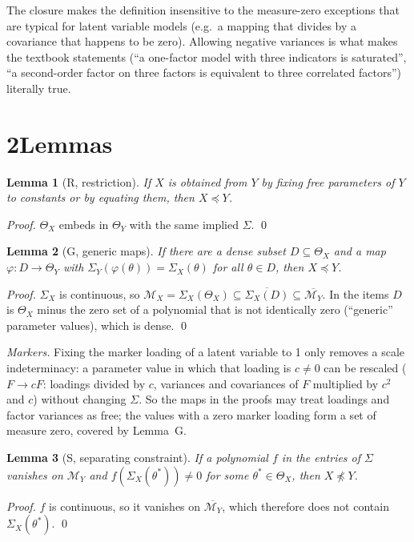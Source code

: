 \documentclass[10pt,a4paper]{article}
\newcommand{\nest}{\preceq}
\newcommand{\nnest}{\not\preceq}
\newtheorem*{lemma}{Lemma}
\begin{document}
The closure makes the definition insensitive to the measure-zero exceptions that are typical for latent variable models (e.g.\ a mapping that divides by a covariance that happens to be zero). Allowing negative variances is what makes the textbook statements (``a one-factor model with three indicators is saturated'', ``a second-order factor on three factors is equivalent to three correlated factors'') literally true.

\section*{2\quad Lemmas}

\begin{lemma}[R, restriction]
If $X$ is obtained from $Y$ by fixing free parameters of $Y$ to constants or by equating them, then $X\nest Y$.
\end{lemma}
\emph{Proof.} $\Theta_X$ embeds in $\Theta_Y$ with the same implied $\Sigma$. \qed

\begin{lemma}[G, generic maps]
If there are a dense subset $D\subseteq\Theta_X$ and a map $\varphi:D\to\Theta_Y$ with $\Sigma_Y(\varphi(\theta))=\Sigma_X(\theta)$ for all $\theta\in D$, then $X\nest Y$.
\end{lemma}
\emph{Proof.} $\Sigma_X$ is continuous, so $\mathcal M_X=\Sigma_X(\Theta_X)\subseteq\overline{\Sigma_X(D)}\subseteq\overline{\mathcal M_Y}$. In the items $D$ is $\Theta_X$ minus the zero set of a polynomial that is not identically zero (``generic'' parameter values), which is dense. \qed

\emph{Markers.} Fixing the marker loading of a latent variable to 1 only removes a scale indeterminacy: a parameter value in which that loading is $c\neq0$ can be rescaled ($F\to cF$: loadings divided by $c$, variances and covariances of $F$ multiplied by $c^2$ and $c$) without changing $\Sigma$. So the maps in the proofs may treat loadings and factor variances as free; the values with a zero marker loading form a set of measure zero, covered by Lemma~G.

\begin{lemma}[S, separating constraint]
If a polynomial $f$ in the entries of $\Sigma$ vanishes on $\mathcal M_Y$ and $f(\Sigma_X(\theta^*))\neq0$ for some $\theta^*\in\Theta_X$, then $X\nnest Y$.
\end{lemma}
\emph{Proof.} $f$ is continuous, so it vanishes on $\overline{\mathcal M_Y}$, which therefore does not contain $\Sigma_X(\theta^*)$. \qed
\end{document}
